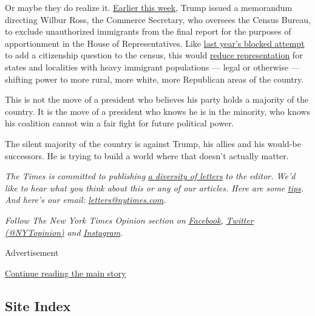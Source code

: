 Or maybe they do realize it.
\href{https://www.vox.com/policy-and-politics/2020/7/21/21328714/trump-executive-order-immigration-census-2020-redistricting}{Earlier
this week}, Trump issued a memorandum directing Wilbur Ross, the
Commerce Secretary, who oversees the Census Bureau, to exclude
unauthorized immigrants from the final report for the purposes of
apportionment in the House of Representatives. Like
\href{https://www.scotusblog.com/2019/07/trump-administration-ends-effort-to-include-citizenship-question-on-2020-census/}{last
year's blocked attempt} to add a citizenship question to the census,
this would
\href{https://www.washingtonpost.com/politics/2019/06/06/where-citizenship-question-could-cause-census-miss-millions-hispanics-why-thats-big-deal/?arc404=true}{reduce
representation} for states and localities with heavy immigrant
populations --- legal or otherwise --- shifting power to more rural,
more white, more Republican areas of the country.

This is not the move of a president who believes his party holds a
majority of the country. It is the move of a president who knows he is
in the minority, who knows his coalition cannot win a fair fight for
future political power.

The silent majority of the country is against Trump, his allies and his
would-be successors. He is trying to build a world where that doesn't
actually matter.

\emph{The Times is committed to publishing}
\href{https://www.nytimes.com/2019/01/31/opinion/letters/letters-to-editor-new-york-times-women.html}{\emph{a
diversity of letters}} \emph{to the editor. We'd like to hear what you
think about this or any of our articles. Here are some}
\href{https://help.nytimes.com/hc/en-us/articles/115014925288-How-to-submit-a-letter-to-the-editor}{\emph{tips}}\emph{.
And here's our email:}
\href{mailto:letters@nytimes.com}{\emph{letters@nytimes.com}}\emph{.}

\emph{Follow The New York Times Opinion section on}
\href{https://www.facebook.com/nytopinion}{\emph{Facebook}}\emph{,}
\href{http://twitter.com/NYTOpinion}{\emph{Twitter (@NYTopinion)}}
\emph{and}
\href{https://www.instagram.com/nytopinion/}{\emph{Instagram}}\emph{.}

Advertisement

\protect\hyperlink{after-bottom}{Continue reading the main story}

\hypertarget{site-index}{%
\subsection{Site Index}\label{site-index}}

